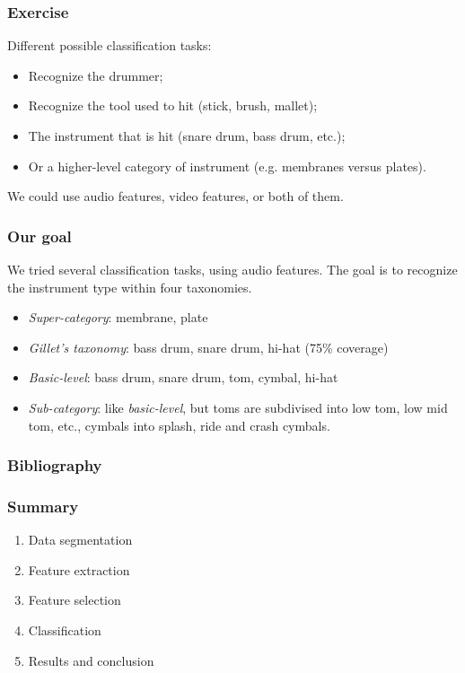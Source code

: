 \documentclass{beamer}
\begin{document}
    \begin{frame}
        \frametitle{Exercise}
        Different possible classification tasks:
        \begin{itemize}
            \item Recognize the drummer;
            \item Recognize the tool used to hit (stick, brush, mallet);
            \item The instrument that is hit (snare drum, bass drum, etc.);
            \item Or a higher-level category of instrument (e.g. membranes versus plates).
        \end{itemize}
        We could use audio features, video features, or both of them.
    \end{frame}
    \begin{frame}
        \frametitle{Our goal}
        We tried several classification tasks, using audio features. The goal is to recognize the instrument type within four taxonomies.
        \begin{itemize}

            \item \emph{Super-category}: membrane, plate
            \item \emph{Gillet's taxonomy}: bass drum, snare drum, hi-hat (75\% coverage)
            \item \emph{Basic-level}: bass drum, snare drum, tom, cymbal, hi-hat
            \item \emph{Sub-category}: like \emph{basic-level}, but toms are subdivised into low tom, low mid tom, etc., cymbals into splash, ride and crash cymbals.
        \end{itemize}
    \end{frame}
    \begin{frame}
        \frametitle{Bibliography}
        \footnotesize 
        \nocite{*}
        
        
        \normalsize
    \end{frame}
    \begin{frame}
        \frametitle{Summary}
        \begin{enumerate}
            \item Data segmentation
            \item Feature extraction
            \item Feature selection
            \item Classification
            \item Results and conclusion
        \end{enumerate}
    \end{frame}
    
\end{document}
